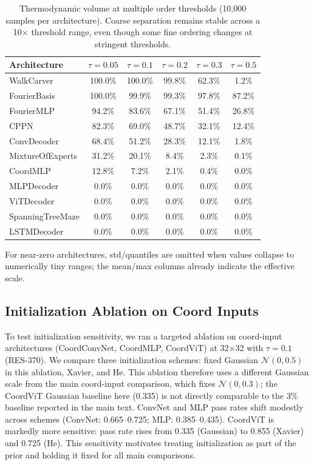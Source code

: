 \begin{table}[H]
\centering
\caption{Thermodynamic volume at multiple order thresholds (10,000 samples per architecture). Coarse separation remains stable across a 10$\times$ threshold range, even though some fine ordering changes at stringent thresholds.}
\label{tab:mc_volume_thresholds}
\begin{tabular}{lccccc}
\toprule
Architecture & $\tau=0.05$ & $\tau=0.1$ & $\tau=0.2$ & $\tau=0.3$ & $\tau=0.5$ \\
\midrule
WalkCarver & 100.0\% & 100.0\% & 99.8\% & 62.3\% & 1.2\% \\
FourierBasis & 100.0\% & 99.9\% & 99.3\% & 97.8\% & 87.2\% \\
FourierMLP & 94.2\% & 83.6\% & 67.1\% & 51.4\% & 26.8\% \\
CPPN & 82.3\% & 69.0\% & 48.7\% & 32.1\% & 12.4\% \\
ConvDecoder & 68.4\% & 51.2\% & 28.3\% & 12.1\% & 1.8\% \\
\midrule
MixtureOfExperts & 31.2\% & 20.1\% & 8.4\% & 2.3\% & 0.1\% \\
CoordMLP & 12.8\% & 7.2\% & 2.1\% & 0.4\% & 0.0\% \\
\midrule
MLPDecoder & 0.0\% & 0.0\% & 0.0\% & 0.0\% & 0.0\% \\
ViTDecoder & 0.0\% & 0.0\% & 0.0\% & 0.0\% & 0.0\% \\
SpanningTreeMaze & 0.0\% & 0.0\% & 0.0\% & 0.0\% & 0.0\% \\
LSTMDecoder & 0.0\% & 0.0\% & 0.0\% & 0.0\% & 0.0\% \\
\bottomrule
\end{tabular}
\end{table}
{\footnotesize For near-zero architectures, std/quantiles are omitted when values collapse to numerically tiny ranges; the mean/max columns already indicate the effective scale.}

\subsection{Initialization Ablation on Coord Inputs}
\label{app:init_ablation}

To test initialization sensitivity, we ran a targeted ablation on coord-input architectures (CoordConvNet, CoordMLP, CoordViT) at 32$\times$32 with $\tau=0.1$ (RES-370). We compare three initialization schemes: fixed Gaussian $\mathcal{N}(0, 0.5)$ in this ablation, Xavier, and He. This ablation therefore uses a different Gaussian scale from the main coord-input comparison, which fixes $\mathcal{N}(0, 0.3)$; the CoordViT Gaussian baseline here (0.335) is not directly comparable to the 3\% baseline reported in the main text. ConvNet and MLP pass rates shift modestly across schemes (ConvNet: 0.665--0.725; MLP: 0.385--0.435). CoordViT is markedly more sensitive: pass rate rises from 0.335 (Gaussian) to 0.855 (Xavier) and 0.725 (He). This sensitivity motivates treating initialization as part of the prior and holding it fixed for all main comparisons.

